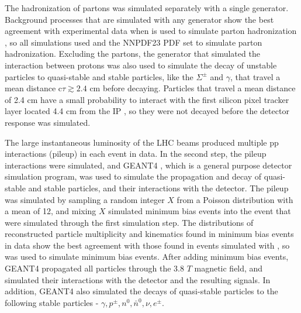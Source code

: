 The hadronization of partons was simulated separately with a single \MC generator.  Background processes that are simulated with any generator 
show the best agreement with experimental data when \PYTHIA is used to simulate parton hadronization \cite{pythiaForHadronization}, so 
all simulations used \PYTHIA and the NNPDF23 PDF set \cite{nnpdf} to simulate parton hadronization.  Excluding the partons, the generator 
that simulated the interaction between protons was also used to simulate the decay of unstable particles to quasi-stable and stable 
particles, like the $\Sigma^{\pm}$ and $\gamma$, that travel a mean distance c$\tau \gtrsim 2.4$ cm before decaying.  Particles that travel 
a mean distance of 2.4 cm have a small probability to interact with the first silicon pixel tracker layer located 4.4 cm from the 
IP \cite{cmsTdrPhysPerformance}, so they were not decayed before the detector response was simulated.



The large instantaneous luminosity of the LHC beams produced multiple pp interactions (pileup) in each event in data.  In the second 
step, the pileup interactions were simulated, and GEANT4 \cite{geant4}, which is a general purpose detector simulation program, was used 
to simulate the propagation and decay of quasi-stable and stable particles, and their interactions with the detector.  The pileup was 
simulated by sampling a random integer $X$ from a Poisson distribution with a mean of 12, and mixing $X$ simulated minimum bias events 
into the event that were simulated through the first simulation step.  The distributions of reconstructed particle multiplicity and 
kinematics found in minimum bias events in data show the best agreement with those found in events simulated with \PYTHIA 
\cite{pythiaForHadronization}, so \PYTHIA was used to simulate minimum bias events.  After adding minimum bias events, GEANT4 propagated 
all particles through the 3.8 $\unit{T}$ magnetic field, and simulated their interactions with the detector and the resulting signals.  
In addition, GEANT4 also simulated the decays of quasi-stable particles to the following stable particles - 
$\gamma,p^{\pm},n^{0},\bar{n}^{0},\nu,e^{\pm}$.

